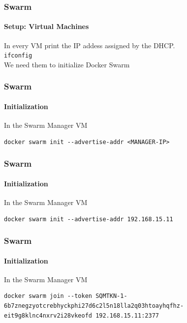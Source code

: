 \begin{frame}[fragile]
\frametitle{Swarm}
\framesubtitle{Setup: Virtual Machines}
In every VM print the IP addess assigned by the DHCP. \\
\lstinline!ifconfig! \\
We need them to initialize Docker Swarm
\end{frame}


\begin{frame}[fragile]
\frametitle{Swarm}
\framesubtitle{Initialization}
In the Swarm Manager VM
\begin{lstlisting}
docker swarm init --advertise-addr <MANAGER-IP>
\end{lstlisting}
\end{frame}

\begin{frame}[fragile]
\frametitle{Swarm}
\framesubtitle{Initialization}
In the Swarm Manager VM
\begin{lstlisting}
docker swarm init --advertise-addr 192.168.15.11
\end{lstlisting}
\end{frame}


\begin{frame}[fragile]
\frametitle{Swarm}
\framesubtitle{Initialization}
In the Swarm Manager VM
\begin{lstlisting}[breaklines=true]
docker swarm join --token SQMTKN-1-6b7znegzyotcrebhyckphi27d6c2l5n18lla2q03htoayhqfhz-eit9g8klnc4nxrv2i28vkeofd 192.168.15.11:2377
\end{lstlisting}
\end{frame}
